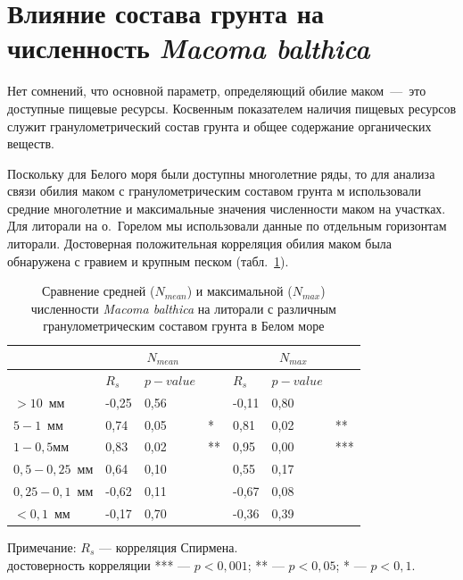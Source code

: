     \section{Влияние состава грунта на численность {\it Macoma balthica}}
Нет сомнений, что основной параметр, определяющий обилие маком~---\ это доступные пищевые   ресурсы.   
Косвенным   показателем   наличия   пищевых   ресурсов   служит гранулометрический состав грунта и общее содержание органических веществ. 

Поскольку для Белого моря были доступны многолетние ряды, то для анализа связи обилия маком с гранулометрическим составом грунта м использовали средние многолетние и максимальные значения численности маком на участках. 
Для литорали на о.~Горелом мы использовали данные по отдельным горизонтам литорали.
Достоверная положительная корреляция обилия маком была обнаружена с гравием и крупным песком (табл.~\ref{tab:grunt_N_correlation_White}).
	\begin{table}[p]
	\begin{center}
		\caption{Сравнение средней ($N_{mean}$) и максимальной ($N_{max}$) численности {\it Macoma balthica} на литорали с различным гранулометрическим составом грунта в Белом море}
	\label{tab:grunt_N_correlation_White}
	\begin{tabularx}{\textwidth}{|l|XXl|XXl|}
	\hline
	& \multicolumn{3}{c|}{$N_{mean}$} & \multicolumn{3}{c|}{$N_{max}$}\\ \hline
           & $R_s$ & $p-value$ &    & $R_s$ & $p-value$ &     \\ \hline
	$> 10$~мм   & -0,25     & 0,56    &    & -0,11    & 0,80   &     \\ \hline
	$5 - 1$~мм  & 0,74      & 0,05    & *  & 0,81     & 0,02   & **  \\ \hline
	$1 - 0,5$мм  & 0,83      & 0,02    & ** & 0,95     & 0,00   & *** \\ \hline
	$0,5 - 0,25$~мм & 0,64      & 0,10    &    & 0,55     & 0,17   &     \\ \hline
	$0,25 - 0,1$~мм  & -0,62     & 0,11    &    & -0,67    & 0,08   &     \\ \hline
	$< 0,1$~мм  & -0,17     & 0,70    &    & -0,36    & 0,39   &    \\\hline
	\end{tabularx}
	\end{center}
	    {\footnotesize Примечание: $R_s$ --- корреляция Спирмена. \\
	    достоверность корреляции *** --- $p<0,001$; ** --- $p<0,05$; * --- $p<0,1$.}
	\end{table}

